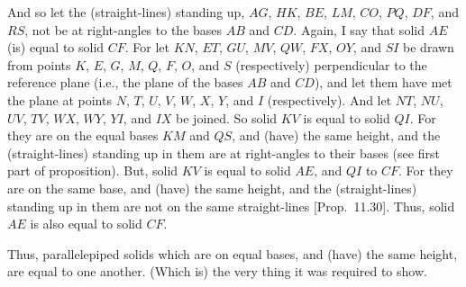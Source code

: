 \begin{Parallel}{}{}
{\epsfysize=1.8in
\centerline{}

And so let the (straight-lines) standing up, $AG$, $HK$, $BE$,
$LM$, $CO$, $PQ$, $DF$, and $RS$, not be at right-angles to
the bases $AB$ and $CD$. Again, I say that solid $AE$ (is) equal to
solid  $CF$. For let $KN$, $ET$, $GU$, $MV$, $QW$, $FX$, $OY$, and
$SI$ be drawn from points $K$, $E$, $G$, $M$, $Q$, $F$, $O$, and
$S$ (respectively) perpendicular to the reference plane ({\rm  i.e.}, the plane of the bases $AB$ and $CD$), and let them have met
the plane at points $N$, $T$, $U$, $V$, $W$, $X$, $Y$, and $I$ (respectively). And let $NT$, $NU$, $UV$, $TV$, $WX$, $WY$, $YI$, and
$IX$ be joined. So solid $KV$ is equal to solid $QI$. For they are on
the equal bases $KM$ and $QS$, and (have) the same height, and the (straight-lines) standing up in them are at right-angles to their bases (see first part of proposition).  But, solid $KV$ is equal to
solid $AE$, and $QI$ to $CF$.
For they are on the same base, and (have)
the same height, and the (straight-lines) standing up in them are not on
the same straight-lines [Prop.~11.30]. Thus,
solid $AE$ is also equal to solid $CF$.

Thus, parallelepiped solids which are on equal bases,
and (have) the same height, are equal to one another. (Which is) the very thing
it was required to show.}
\end{Parallel}

